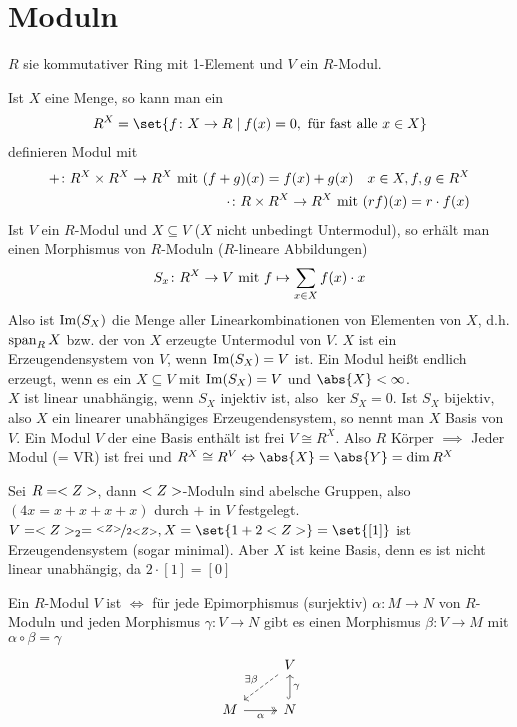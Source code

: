 \section{Moduln}
$R$ sie kommutativer Ring mit 1-Element und $V$ ein $R$-Modul.
\begin{erinnerung}
	Ist $X$ eine Menge, so kann man ein
	\begin{align*}
		R^X = \set{f\colon X \to R \mid f(x) = 0, \text{ für fast alle }x \in X}
	\end{align*}
	definieren Modul mit
	\begin{align*}
		+ \colon R^X \times R^X \to R^X \mit (f+g)(x) = f(x)+g(x)\quad x \in X, f,g \in R^X\\
		\cdot\colon R \times R^X \to R^X \mit (rf)(x) = r\cdot f(x)
	\end{align*}
	Ist $V$ ein $R$-Modul und $X \subseteq V$ ($X$ nicht unbedingt Untermodul), so erhält man einen Morphismus von $R$-Moduln ($R$-lineare Abbildungen)
	\begin{align*}
		S_x\colon R^X \to V \mit f \mapsto \sum_{x\in X}f(x)\cdot x
	\end{align*}
	Also ist $\Image(S_X)$ die Menge aller Linearkombinationen von Elementen von $X$, d.h. $\Span_R X$ bzw. der von $X$ erzeugte Untermodul von $V$. $X$ ist ein Erzeugendensystem von $V$, wenn $\Image(S_X) = V$ ist. Ein Modul heißt endlich erzeugt, wenn es ein $X \subseteq V$ mit $\Image(S_X) = V$ und $\abs{X} < \infty$.\\
	$X$ ist linear unabhängig, wenn $S_X$ injektiv ist, also $\ker S_X = 0$. Ist $S_X$ bijektiv, also $X$ ein linearer unabhängiges Erzeugendensystem, so nennt man $X$ Basis von $V$. Ein Modul $V$ der eine Basis enthält ist frei $V \cong R^X$. Also $R$ Körper $\implies$ Jeder Modul (= VR) ist frei und $R^X \cong R^V \Leftrightarrow \abs{X} = \abs{Y} = \dim R^X$
\end{erinnerung}
\begin{example}
	Sei $R = \Z$, dann $\Z$-Moduln sind abelsche Gruppen, also $(4x = x+x+x+x)$ durch $+$ in $V$ festgelegt. $V = \Z_2 = \lnkset{\Z}{2 \Z}, X = \set{1 + 2\Z} = \set{[1]}$ ist Erzeugendensystem (sogar minimal). Aber $X$ ist keine Basis, denn es ist nicht linear unabhängig, da $2 \cdot [1] = [0]$
\end{example}
\begin{definition}
	Ein $R$-Modul $V$ ist  $\Leftrightarrow$ für jede Epimorphismus (surjektiv) $\alpha \colon M \to N$ von $R$-Moduln und jeden Morphismus $\gamma \colon V \to N$ gibt es einen Morphismus $\beta \colon V \to M$ mit $\alpha \circ \beta = \gamma$
	\[
		\begin{tikzcd}
		& V \arrow[ld, "\exists \beta"', dashed] \\
		M \arrow[r, "\alpha"', two heads] & N \arrow[u, "\gamma"', hook]          
		\end{tikzcd}
	\]
\end{definition}

